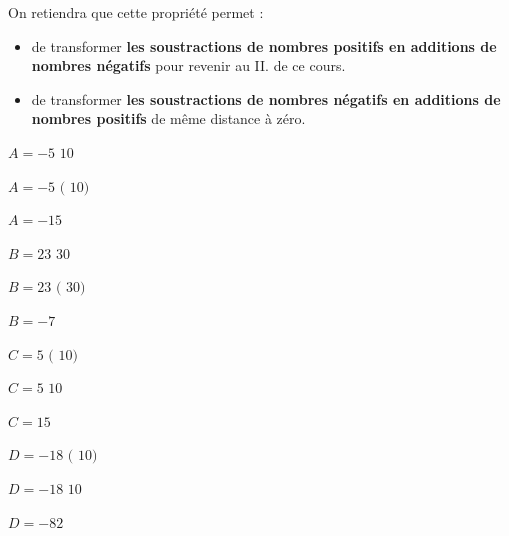 \documentclass[a4paper]{book}
\begin{document}
    \begin{methode}
        On retiendra que cette propriété permet : 
        \begin{itemize}
            \item de transformer \textbf{les soustractions de nombres positifs en additions de nombres négatifs} pour revenir au II. de ce cours.
            
            \item de transformer \textbf{les soustractions de nombres négatifs en additions de nombres positifs} de même distance à zéro.
        \end{itemize}


        \begin{minipage}{0.24\linewidth}
            $A= -5$ \fbox{-} $10$

            \medskip 
            
            $A =-5 $ \fbox{+} $\big( $ \fbox{-} $10\big)$

            \medskip

            $A = -15$
        \end{minipage}
        \hfill\vline\hfill
        \begin{minipage}{0.24\linewidth}
            $B= 23$ \fbox{-} $30$

            \medskip 

            $B =23 $ \fbox{+} $\big( $ \fbox{-} $30\big)$

            \medskip

            $B = -7$
        \end{minipage} 
        \hfill\vline\hfill
        \begin{minipage}{0.24\linewidth}
            $C= 5$ \fbox{-} $\big( $ \fbox{-} $10\big)$

            \medskip 
            
            $C =5 $ \fbox{+} $ 10$

            \medskip 

            $C= 15$
        \end{minipage} 
        \hfill\vline\hfill
        \begin{minipage}{0.24\linewidth}
            $D= -18$ \fbox{-} $\big( $ \fbox{-} $10\big)$

            \medskip 
            
            $D = -18 $ \fbox{+} $ 10$
            
            \medskip 
            
            $D =-82$
        \end{minipage} 
    \end{methode}
\end{document}
